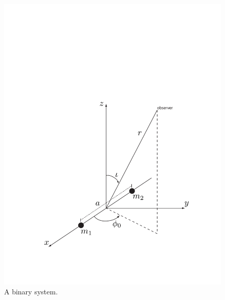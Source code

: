 \begin{figure}[p]
\begin{center}
\includegraphics[width=\linewidth]{figures/inspiral/binary}
\end{center}
\caption{\label{f:binary}%
A binary system.
}
\end{figure}

